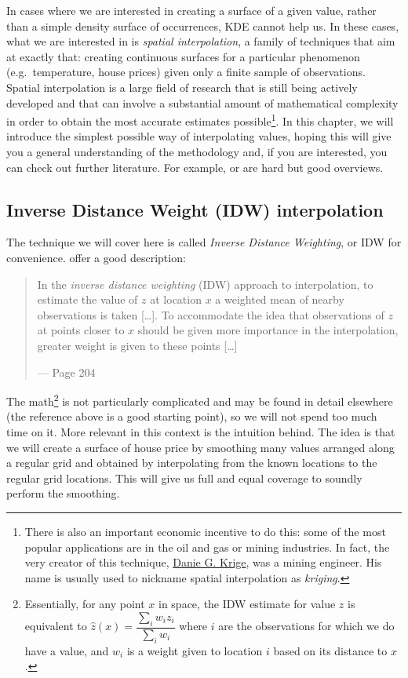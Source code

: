 \documentclass[
]{book}
\begin{document}
In cases where we are interested in creating a surface of a given value, rather than a simple density surface of occurrences, KDE cannot help us. In these cases, what we are interested in is \emph{spatial interpolation}, a family of techniques that aim at exactly that: creating continuous surfaces for a particular phenomenon (e.g.~temperature, house prices) given only a finite sample of observations. Spatial interpolation is a large field of research that is still being actively developed and that can involve a substantial amount of mathematical complexity in order to obtain the most accurate estimates possible\footnote{There is also an important economic incentive to do this: some of the most popular applications are in the oil and gas or mining industries. In fact, the very creator of this technique, \href{https://en.wikipedia.org/wiki/Danie_G._Krige}{Danie G. Krige}, was a mining engineer. His name is usually used to nickname spatial interpolation as \emph{kriging}.}. In this chapter, we will introduce the simplest possible way of interpolating values, hoping this will give you a general understanding of the methodology and, if you are interested, you can check out further literature. For example, \citet{banerjee2014hierarchical} or \citet{cressie2015statistics} are hard but good overviews.

\hypertarget{inverse-distance-weight-idw-interpolation}{%
\subsection{Inverse Distance Weight (IDW) interpolation}\label{inverse-distance-weight-idw-interpolation}}

The technique we will cover here is called \emph{Inverse Distance Weighting}, or IDW for convenience. \citet{comber2015} offer a good description:

\begin{quote}
In the \emph{inverse distance weighting} (IDW) approach to interpolation, to estimate the value of \(z\) at location \(x\) a weighted mean of nearby observations is taken {[}\ldots{]}. To accommodate the idea that observations of \(z\) at points closer to \(x\) should be given more importance in the interpolation, greater weight is given to these points {[}\ldots{]}

--- Page 204
\end{quote}

The math\footnote{Essentially, for any point \(x\) in space, the IDW estimate for value \(z\) is equivalent to \(\hat{z} (x) = \dfrac{\sum_i w_i z_i}{\sum_i w_i}\) where \(i\) are the observations for which we do have a value, and \(w_i\) is a weight given to location \(i\) based on its distance to \(x\).} is not particularly complicated and may be found in detail elsewhere (the reference above is a good starting point), so we will not spend too much time on it. More relevant in this context is the intuition behind. The idea is that we will create a surface of house price by smoothing many values arranged along a regular grid and obtained by interpolating from the known locations to the regular grid locations. This will give us full and equal coverage to soundly perform the smoothing.
\end{document}
